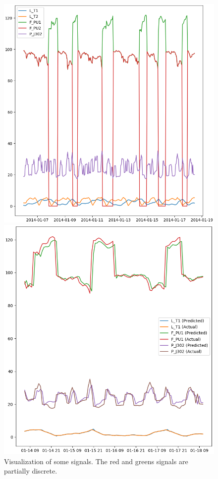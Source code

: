 \documentclass[]{article}
\begin{document}
\begin{figure}[H]
\begin{minipage}{.5\textwidth}
  \includegraphics[width=0.8\linewidth, keepaspectratio]{./visuallizations/signals.png}
  \caption{Visualization of some signals. The red and greens signals are partially discrete.}
  \label{fig:test1}
\end{minipage} %
\begin{minipage}{.5\textwidth}
  \includegraphics[width=0.8\linewidth, keepaspectratio]{./visuallizations/predictions.png}

\end{minipage}
\end{figure}
\end{document}
